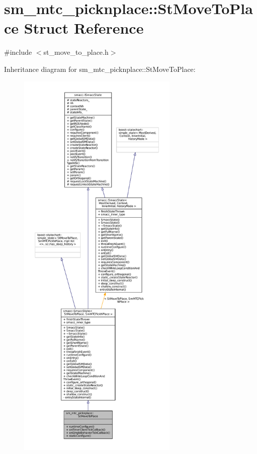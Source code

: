 \hypertarget{structsm__mtc__picknplace_1_1StMoveToPlace}{}\section{sm\+\_\+mtc\+\_\+picknplace\+:\+:St\+Move\+To\+Place Struct Reference}
\label{structsm__mtc__picknplace_1_1StMoveToPlace}


{\ttfamily \#include $<$st\+\_\+move\+\_\+to\+\_\+place.\+h$>$}



Inheritance diagram for sm\+\_\+mtc\+\_\+picknplace\+:\+:St\+Move\+To\+Place\+:
\nopagebreak
\begin{figure}[H]
\begin{center}
\leavevmode
\includegraphics[height=550pt]{structsm__mtc__picknplace_1_1StMoveToPlace__inherit__graph}
\end{center}
\end{figure}


